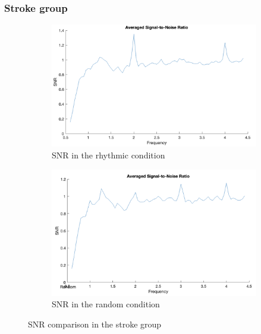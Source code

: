 \subsubsection*{Stroke group}
\begin{figure}[H]
    \centering
    \begin{subfigure}[b]{0.48\textwidth}
        \centering
        \includegraphics[width=\textwidth]{stroke_images/rhythmic_snr.png}
        \caption{SNR in the rhythmic condition}
        \label{fig: snr_rhythmic: stroke}
    \end{subfigure}
    \hfill
    \begin{subfigure}[b]{0.48\textwidth}
        \centering
        \includegraphics[width=\textwidth]{stroke_images/random_snr.png}
        \caption{SNR in the random condition}
        \label{fig: snr_random: stroke}
    \end{subfigure}
    \caption{SNR comparison in the stroke group}
    \label{fig: snr_stroke_group}
\end{figure}

